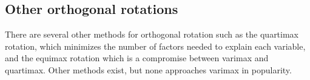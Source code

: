 
\subsection{Other orthogonal rotations}
There are several other methods for orthogonal rotation such as the quartimax
rotation, which minimizes the number of factors needed to explain each
variable, and the equimax rotation which is a compromise between varimax
and quartimax. Other methods exist, but none approaches varimax in popularity.
